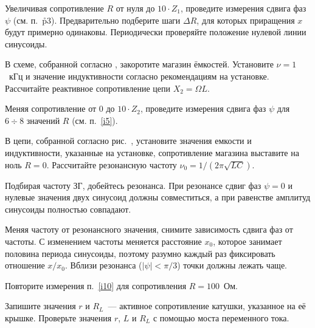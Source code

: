 \begin{lab:task}
	\item \label{i5} Увеличивая сопротивление $R$ от нуля до $10\cdot Z_1$,
проведите измерения сдвига фаз $\psi$ (см. п.~\r{p3}).
	Предварительно подберите шаги $\Delta R$, для которых приращения $x$ будут
примерно одинаковы. Периодически проверяйте
	положение нулевой линии синусоиды.


	\item В схеме, собранной согласно , закоротите магазин
ёмкостей. Установите  $\nu=1$~кГц и значение индуктивности согласно
рекомендациям на установке. Рассчитайте реактивное сопротивление цепи
$X_2=\Omega L$.

	\item Меняя сопротивление от 0 до $10\cdot Z_2$, проведите измерения сдвига
фаз $\psi$ для $6\div8$ значений $R$ (см.
	п.~\ref{i5}).


	\item В цепи, собранной согласно рис.~, установите значения
емкости и индуктивности, указанные на установке, сопротивление магазина
выставите на ноль
	$R=0$. Рассчитайте резонансную частоту $\nu_0=1/(2\pi\sqrt{LC})$.

	\item Подбирая частоту ЗГ, добейтесь резонанса. При резонансе сдвиг фаз
$\psi=0$ и нулевые значения двух синусоид должны
	совместиться, а при равенстве амплитуд синусоиды полностью совпадают.

	\item \label{i10} Меняя частоту  от резонансного
значения, снимите зависимость сдвига фаз от частоты. С
	изменением частоты меняется расстояние $x_0$, которое занимает половина
периода синусоиды, поэтому разумно каждый раз
	фиксировать отношение $x/x_0$. Вблизи резонанса ($|\psi|<\pi/3$) точки
должны лежать чаще.

	\item Повторите измерения п.~\ref{i10} для сопротивления $R=100$~Ом.

	\item Запишите значения $r$ и $R_L$~--- активное сопротивление катушки,
указанное на её крышке. Проверьте значения $r$, $L$ и $R_L$ с
	помощью моста переменного тока.



\end{lab:task}
